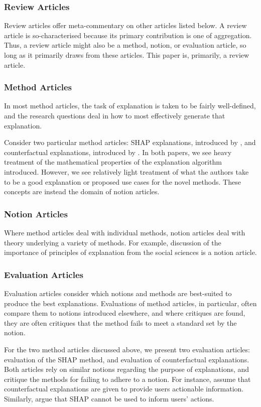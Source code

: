 \subsubsection{Review Articles}
Review articles offer meta-commentary on other articles listed below. A review article is so-characterised because its primary contribution is one of aggregation. Thus, a review article might also be a method, notion, or evaluation article, so long as it primarily draws from these articles. This paper is, primarily, a review article.

\subsubsection{Method Articles}
In most method articles, the task of explanation is taken to be fairly well-defined, and the research questions deal in how to most effectively generate that explanation. 

Consider two particular method articles: SHAP explanations, introduced by \textcite{lundberg_unified_2017}, and counterfactual explanations, introduced by \textcite{wachter_counterfactual_2017}. In both papers, we see heavy treatment of the mathematical properties of the explanation algorithm introduced. However, we see relatively light treatment of what the authors take to be a good explanation or proposed use cases for the novel methods. These concepts are instead the domain of notion articles.

\subsubsection{Notion Articles}
Where method articles deal with individual methods, notion articles deal with theory underlying a variety of methods. For example, \textcite{miller_explanation_2017} discussion of the importance of principles of explanation from the social sciences is a notion article.

\subsubsection{Evaluation Articles}
Evaluation articles consider which notions and methods are best-suited to produce the best explanations. Evaluations of method articles, in particular, often compare them to notions introduced elsewhere, and where critiques are found, they are often critiques that the method fails to meet a standard set by the notion.

For the two method articles discussed above, we present two evaluation articles: \textcite{kumar_problems_2020} evaluation of the SHAP method, and \textcite{barocas_hidden_2020} evaluation of counterfactual explanations. Both articles rely on similar notions regarding the purpose of explanations, and critique the methods for failing to adhere to a notion. For instance, \textcite{barocas_hidden_2020} assume that counterfactual explanations are given to provide users actionable information. Similarly, \textcite{kumar_problems_2020} argue that SHAP cannot be used to inform users' actions.

